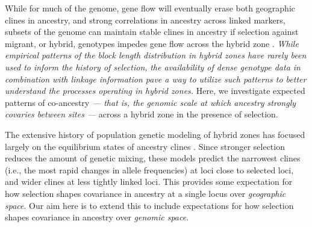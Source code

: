 \documentclass[11pt,letterpaper]{article}
\newcommand{\alisa}[1]{{\em \color{red} #1}}
\newcommand{\yb}[1]{{\em \color{magenta} #1}}
\begin{document}
While for much of the genome, gene flow will eventually erase 
both geographic clines in ancestry, and strong correlations in ancestry across linked markers, 
subsets of the genome can maintain stable clines in ancestry if selection against migrant, or hybrid, genotypes impedes gene flow across the hybrid zone \citep{Barton1979a}. 
\yb{While empirical patterns of the block length distribution in hybrid zones have rarely been used to inform the history of selection,}  \alisa{the availability of dense genotype data in combination with linkage information pave a way to utilize such patterns to better understand the processes operating in hybrid zones. } %
Here, we investigate expected patterns of co-ancestry \yb{ --- that is, the genomic scale at which ancestry strongly covaries between sites --- } across a hybrid zone in the presence of selection. 


The extensive history of population genetic modeling of hybrid zones has focused largely on the equilibrium states of ancestry clines \citep{Barton1979a,Barton1986}.  
Since stronger selection reduces the amount of genetic mixing,
these models predict the narrowest clines 
(i.e., the most rapid changes in allele frequencies)
at loci close to selected loci, and wider clines at less tightly linked loci.
This provides some expectation for how selection shapes covariance in ancestry at a single locus over \emph{geographic space}.
Our aim here is to extend this to include expectations for how selection shapes covariance in ancestry over \emph{genomic space}.
\end{document}
